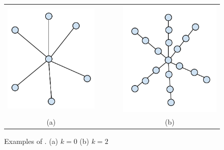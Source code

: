 \begin{figure}[t]
  \centering
  \begin{tabular}[h]{ccccc}
    \includegraphics[scale=0.3]{../img/star.pdf} &&&&
    \includegraphics[scale=0.3]{../img/kstar.pdf}\\
    (a) &&&& (b)
  \end{tabular}
  \caption{\figtabsize Examples of {\kstars}. (a) $k = 0$ (b) $k = 2$
  }
  \label{fig:ksubstar}
\end{figure}

